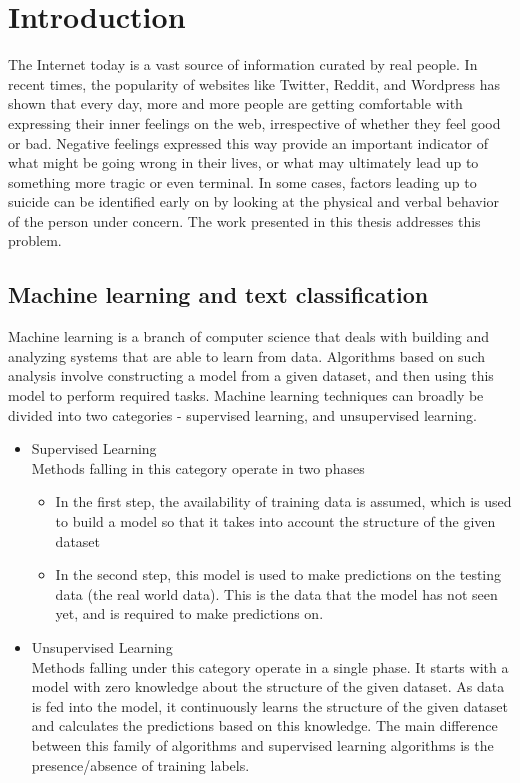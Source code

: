 \chapter{Introduction}
\label{chapter:Introduction}

The Internet today is a vast source of information curated by real people. In recent times, the popularity of websites like Twitter, Reddit, and Wordpress has shown that every day, more and more people are getting comfortable with expressing their inner feelings on the web, irrespective of whether they feel good or bad. Negative feelings expressed this way provide an important indicator of what might be going wrong in their lives, or what may ultimately lead up to something more tragic or even terminal. In some cases, factors leading up to suicide can be identified early on by looking at the physical and verbal behavior of the person under concern. The work presented in this thesis addresses this problem.

\section{Machine learning and text classification}
Machine learning is a branch of computer science that deals with building and analyzing systems that are able to learn from data. Algorithms based on such analysis involve constructing a model from a given dataset, and then using this model to perform required tasks. Machine learning techniques can broadly be divided into two categories - supervised learning, and unsupervised learning.

\begin{itemize}
    \item{
    Supervised Learning\\
    Methods falling in this category operate in two phases
    \begin{itemize}
        \item{In the first step, the availability of training data is assumed, which is used to build a model so that it takes into account the structure of the given dataset}
        \item{In the second step, this model is used to make predictions on the testing data (the real world data). This is the data that the model has not seen yet, and is required to make predictions on.}
    \end{itemize}
    }
    \item{
    Unsupervised Learning\\
    Methods falling under this category operate in a single phase. It starts with a model with zero knowledge about the structure of the given dataset. As data is fed into the model, it continuously learns the structure of the given dataset and calculates the predictions based on this knowledge. The main difference between this family of algorithms and supervised learning algorithms is the presence/absence of training labels.
    }
\end{itemize}

